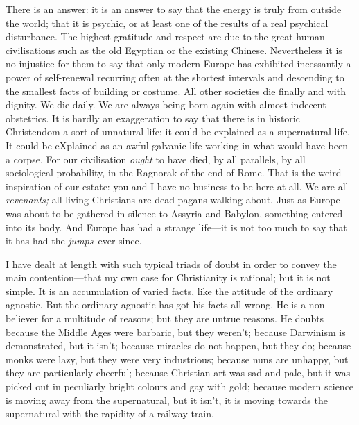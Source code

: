 \documentclass{book}
\begin{document}
There is an answer: it is an answer to say that the energy is truly from outside the world; that it is psychic, or at least one of the results of a real psychical disturbance. The highest gratitude and respect are due to the great human civilisations such as the old Egyptian or the existing Chinese. Nevertheless it is no injustice for them to say that only modern Europe has exhibited incessantly a power of self-renewal recurring often at the shortest intervals and descending to the smallest facts of building or costume. All other societies die finally and with dignity. We die daily. We are always being born again with almost indecent obstetrics. It is hardly an exaggeration to say that there is in historic Christendom a sort of unnatural life: it could be explained as a supernatural life. It could be eXplained as an awful galvanic life working in what would have been a corpse. For our civilisation \emph{ought} to have died, by all parallels, by all sociological probability, in the Ragnorak of the end of Rome. That is the weird inspiration of our estate: you and I have no business to be here at all. We are all \emph{revenants;} all living Christians are dead pagans walking about. Just as Europe was about to be gathered in silence to Assyria and Babylon, something entered into its body. And Europe has had a strange life—it is not too much to say that it has had the \emph{jumps}–ever since.

I have dealt at length with such typical triads of doubt in order to convey the main contention—that my own case for Christianity is rational; but it is not simple. It is an accumulation of varied facts, like the attitude of the ordinary agnostic. But the ordinary agnostic has got his facts all wrong. He is a non-believer for a multitude of reasons; but they are untrue reasons. He doubts because the Middle Ages were barbaric, but they weren’t; because Darwinism is demonstrated, but it isn’t; because miracles do not happen, but they do; because monks were lazy, but they were very industrious; because nuns are unhappy, but they are particularly cheerful; because Christian art was sad and pale, but it was picked out in peculiarly bright colours and gay with gold; because modern science is moving away from the supernatural, but it isn’t, it is moving towards the supernatural with the rapidity of a railway train.
\end{document}
